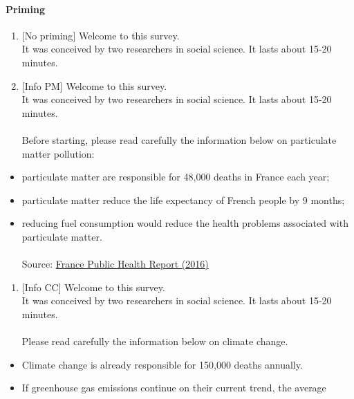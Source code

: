\documentclass[12pt]{article} %
\begin{document}
\begin{appendices}
\paragraph{Priming}
\begin{enumerate}[leftmargin=*]
\item {[}No priming{]} Welcome to this survey. \\
It was conceived by two researchers in social science. It lasts about
15-20 minutes.
\item {[}Info PM{]} Welcome to this survey. \\
It was conceived by two researchers in social science. It lasts about
15-20 minutes.\\
\\
Before starting, please read carefully the information below on particulate
matter pollution: 
\end{enumerate}
\begin{itemize}
\item particulate matter are responsible for 48,000 deaths in France each
year; 
\item particulate matter reduce the life expectancy of French people by
9 months; 
\item reducing fuel consumption would reduce the health problems associated
with particulate matter. \\
\\
Source: \href{http://invs.santepubliquefrance.fr/Publications-et-outils/Rapports-et-syntheses/Environnement-et-sante/2016/Impacts-de-l-exposition-chronique-aux-particules-fines-sur-la-mortalite-en-France-continentale-et-analyse-des-gains-en-sante-de-plusieurs-scenarios-de-reduction-de-la-pollution-atmospherique}{France Public Health Report (2016)}
\end{itemize}
\begin{enumerate}[resume,leftmargin=*]
\item {[}Info CC{]} Welcome to this survey. \\
It was conceived by two researchers in social science. It lasts about
15-20 minutes.\\
\\
Please read carefully the information below on climate change. \\
\end{enumerate}
\begin{itemize}
\item Climate change is already responsible for 150,000 deaths annually.
\item If greenhouse gas emissions continue on their current trend, the average

\end{itemize}
\end{appendices}
\end{document}
